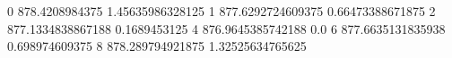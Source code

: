0 878.4208984375 1.45635986328125
1 877.6292724609375 0.66473388671875
2 877.1334838867188 0.1689453125
4 876.9645385742188 0.0
6 877.6635131835938 0.698974609375
8 878.289794921875 1.32525634765625
